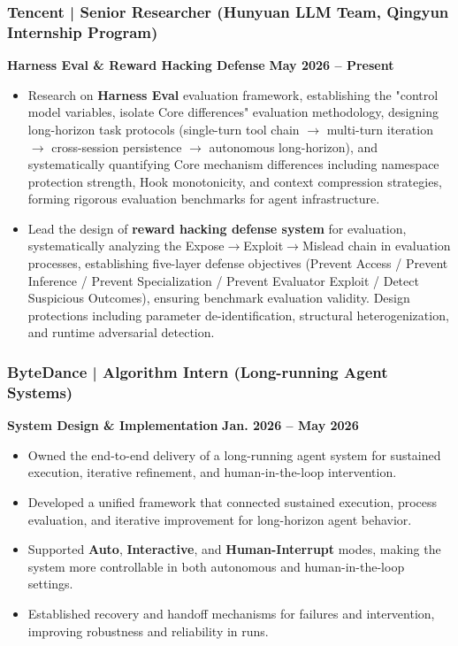 \documentclass[10pt,a4paper]{article}
\begin{document}
    \subsubsection*{\color{itemcolor}Tencent | Senior Researcher (Hunyuan LLM Team, Qingyun Internship Program)}
    \noindent\textbf{\color{sectioncolor}Harness Eval \& Reward Hacking Defense} \hfill \color{accentcolor}\textbf{May 2026 -- Present}
    \begin{itemize}[leftmargin=*, label=\textcolor{accentcolor}{\textbullet}, itemsep=0.2em]
        \item Research on \textbf{Harness Eval} evaluation framework, establishing the "control model variables, isolate Core differences" evaluation methodology, designing long-horizon task protocols (single-turn tool chain $\rightarrow$ multi-turn iteration $\rightarrow$ cross-session persistence $\rightarrow$ autonomous long-horizon), and systematically quantifying Core mechanism differences including namespace protection strength, Hook monotonicity, and context compression strategies, forming rigorous evaluation benchmarks for agent infrastructure.
        \item Lead the design of \textbf{reward hacking defense system} for evaluation, systematically analyzing the Expose$\rightarrow$Exploit$\rightarrow$Mislead chain in evaluation processes, establishing five-layer defense objectives (Prevent Access / Prevent Inference / Prevent Specialization / Prevent Evaluator Exploit / Detect Suspicious Outcomes), ensuring benchmark evaluation validity. Design protections including parameter de-identification, structural heterogenization, and runtime adversarial detection.
    \end{itemize}

    \subsubsection*{\color{itemcolor}ByteDance | Algorithm Intern (Long-running Agent Systems)}
    \noindent\textbf{\color{sectioncolor}System Design \& Implementation} \hfill \color{accentcolor}\textbf{Jan. 2026 -- May 2026}
    \begin{itemize}[leftmargin=*, label=\textcolor{accentcolor}{\textbullet}, itemsep=0.2em]
        \item Owned the end-to-end delivery of a long-running agent system for sustained execution, iterative refinement, and human-in-the-loop intervention.
        \item Developed a unified framework that connected sustained execution, process evaluation, and iterative improvement for long-horizon agent behavior.
        \item Supported \textbf{Auto}, \textbf{Interactive}, and \textbf{Human-Interrupt} modes, making the system more controllable in both autonomous and human-in-the-loop settings.
        \item Established recovery and handoff mechanisms for failures and intervention, improving robustness and reliability in runs.
    \end{itemize}
\end{document}
